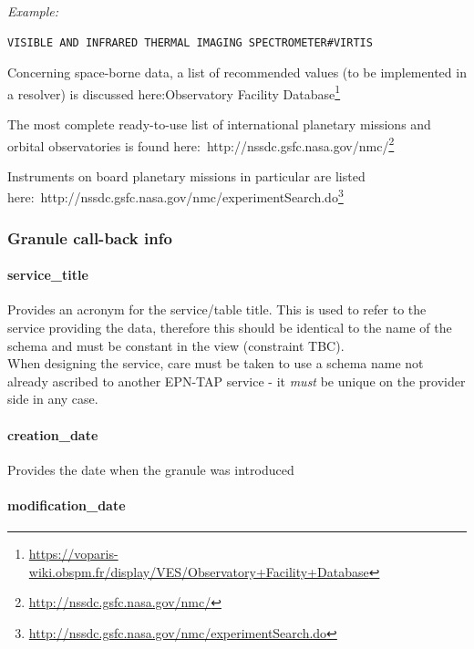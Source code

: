 \documentclass[11pt,a4paper]{ivoa}
\begin{document}
\emph{\emph{Example:}}






\begin{verbatim}
VISIBLE AND INFRARED THERMAL IMAGING SPECTROMETER#VIRTIS
\end{verbatim}




Concerning space-borne data, a list of recommended values (to be implemented in a resolver) is discussed here:Observatory Facility Database\footnote{\url{https://voparis-wiki.obspm.fr/display/VES/Observatory+Facility+Database}}

The most complete ready-to-use list of international planetary missions and orbital observatories is found here: http://nssdc.gsfc.nasa.gov/nmc/\footnote{\url{http://nssdc.gsfc.nasa.gov/nmc/}}

Instruments on board planetary missions in particular are listed here: http://nssdc.gsfc.nasa.gov/nmc/experimentSearch.do\footnote{\url{http://nssdc.gsfc.nasa.gov/nmc/experimentSearch.do}}

\subsubsection{Granule call-back info}

\paragraph{service\_title}

Provides an acronym for the service/table title. This is used to refer to the service providing the data, therefore this should be identical to the name of the schema and must be constant in the view (constraint TBC).\\When designing the service, care must be taken to use a schema name not already ascribed to another EPN-TAP service - it \emph{must} be unique on the provider side in any case.

\paragraph{creation\_date}

Provides the date when the granule was introduced

\paragraph{modification\_date}
\end{document}
